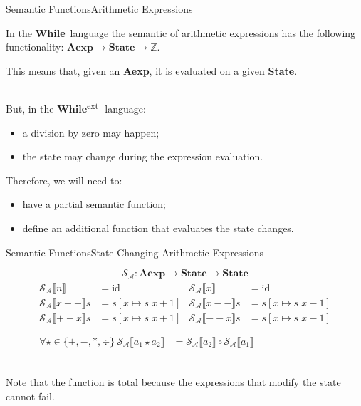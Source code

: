 \documentclass{beamer}
\newcommand{\While}{\textbf{While}}
\newcommand{\ExtWhile}{\textbf{While}\ensuremath{^{\mbox{\footnotesize ext}}}}
\newcommand{\Aexp}{\textbf{Aexp}}
\newcommand{\State}{\textbf{State}}
\newcommand{\Z}{\mathbb{Z}}
\newcommand{\sem}[2]{\mathcal{#1} \llbracket #2 \rrbracket}
\begin{document}
\begin{frame}{Semantic Functions}{Arithmetic Expressions}

    In the \While\ language the semantic of arithmetic expressions has the following functionality: $\Aexp \to \State \to \Z$.

    This means that, given an \Aexp, it is evaluated on a given \State.

    ~\\
    But, in the \ExtWhile\ language:
    \begin{itemize}
        \item<2-> a division by zero may happen;
        \item<3-> the state may change during the expression evaluation.
    \end{itemize}
    Therefore, we will need to:
    \begin{itemize}
        \item<2-> have a partial semantic function;
        \item<3-> define an additional function that evaluates the state changes.
    \end{itemize}

\end{frame}

\begin{frame}{Semantic Functions}{State Changing Arithmetic Expressions}

    $$\mathcal{S_A} : \Aexp \to \State \to \State$$
    \begin{gather*}
        \begin{aligned}
            \sem{S_A}{n}      & = \mathrm{id}         &
            \sem{S_A}{x}      & = \mathrm{id}           \\
            \sem{S_A}{x+\!+}s & = s[x \mapsto s\;x+1] &
            \sem{S_A}{x-\!-}s & = s[x \mapsto s\;x-1]   \\
            \sem{S_A}{+\!+x}s & = s[x \mapsto s\;x+1] &
            \sem{S_A}{-\!-x}s & = s[x \mapsto s\;x-1]   \\
        \end{aligned} \\
        \begin{aligned}
            \forall \star \in \{+, -, *, \div\}\
            \sem{S_A}{a_1 \star a_2} & = \sem{S_A}{a_2} \circ \sem{S_A}{a_1}
        \end{aligned}
    \end{gather*}

    ~\\
    Note that the function is total because the expressions that modify the state cannot fail.

\end{frame}
\end{document}
